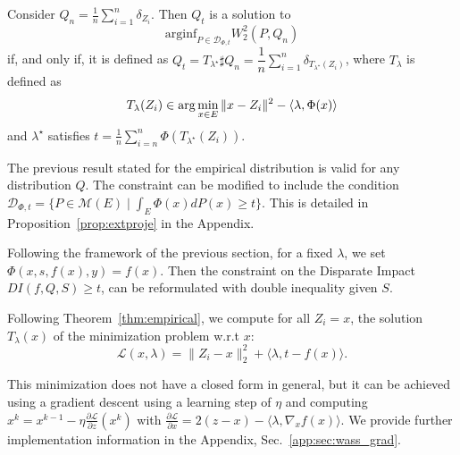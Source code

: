 \documentclass[runningheads, orivec]{llncs}
\begin{document}
\begin{theorem}\label{thm:empirical}
Consider $Q_n=\frac{1}{n} \sum_{i=1}^n \delta_{Z_i}$. Then $Q_t$ is a solution to 
\begin{equation}
\mathrm{arginf}_{P\in\mathcal{D}_{\Phi,t}}W_2^2(P,Q_n)
\end{equation}
if, and only if, it is defined as 
 $Q_{t}=T_{\lambda^\star}\sharp Q_n = \dfrac{1}{n} \sum_{i=1}^n \delta_{T_{\lambda^\star}(Z_i)}$,
where  $T_\lambda$ is defined as
\begin{equation}
 \label{eq:T_lambda}
 T_\lambda(Z_i) \in {\rm arg}\min_{x\in E} \|x-Z_i\|^2 - \langle \lambda , \Phi(x) \rangle
\end{equation}
  and  ${\lambda^\star}$ satisfies  $ t=\frac{1}{n}\sum_{i=n}^n \Phi(T_{\lambda^\star}(Z_i))$.
  \end{theorem}
\begin{remark}
\label{remark_ineq}
  The previous result stated for the empirical distribution is valid for any distribution $Q$. The constraint can be modified to include the condition $\mathcal{D}_{\Phi,t} = \{P\in\mathcal{M}(E)\mid \int_E \Phi(x)dP(x) \geq t\}$. This is detailed in Proposition~\ref{prop:extproje} in the Appendix.
\end{remark}

Following the framework of the previous section, for a fixed $\lambda$, we set $\Phi(x,s,f(x),y) = f(x)$. Then the constraint on the Disparate Impact $DI(f, Q, S) \geq t$, can be reformulated with double inequality given $S$.

Following Theorem~\ref{thm:empirical}, we compute for all $Z_i = x$, the solution $T_\lambda(x)$ of the minimization problem w.r.t $x$: 
\begin{equation}
  \label{eq:prblm_wass_impl}
  \mathcal{L}(x,\lambda) = \|Z_i - x\|_2^2 + \langle \lambda ,t- f(x)\rangle.
\end{equation}

This minimization does not have a closed form in general, but it can be achieved using a gradient descent using a learning step of $\eta$ and computing $x^k=x^{k-1}-\eta \frac{\partial \mathcal{L}}{\partial z}(x^k) $ with 
$\frac{\partial \mathcal{L}}{\partial x} = 2(z-x) - \langle \lambda,  \nabla_xf(x) \rangle$. We provide further implementation information in the Appendix, Sec.~\ref{app:sec:wass_grad}. 
\end{document}
